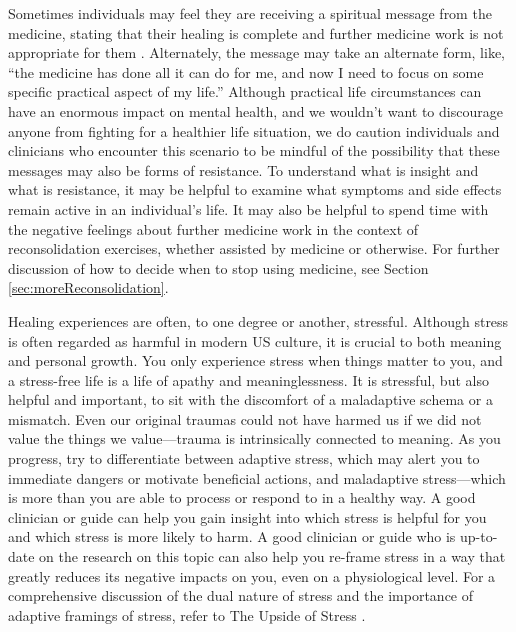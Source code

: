 \documentclass[12pt,letterpaper]{book}
\begin{document}
Sometimes individuals may feel they are receiving a spiritual message from the medicine, stating that their healing is complete and further medicine work is not appropriate for them \cite{razviDissociation}. Alternately, the message may take an alternate form, like, “the medicine has done all it can do for me, and now I need to focus on some specific practical aspect of my life.”  Although practical life circumstances can have an enormous impact on mental health, and we wouldn't want to discourage anyone from fighting for a healthier life situation, we do caution individuals and clinicians who encounter this scenario to be mindful of the possibility that these messages may also be forms of resistance. To understand what is insight and what is resistance, it may be helpful to examine what symptoms and side effects remain active in an individual's life. It may also be helpful to spend time with the negative feelings about further medicine work in the context of reconsolidation exercises, whether assisted by medicine or otherwise. For further discussion of how to decide when to stop using medicine, see Section \ref{sec:moreReconsolidation}.

Healing experiences are often, to one degree or another, stressful. Although stress is often regarded as harmful in modern US culture, it is crucial to both meaning and personal growth. You only experience stress when things matter to you, and a stress-free life is a life of apathy and meaninglessness. It is stressful, but also helpful and important, to sit with the discomfort of a maladaptive schema or a mismatch. Even our original traumas could not have harmed us if we did not value the things we value—trauma is intrinsically connected to meaning. As you progress, try to differentiate between adaptive stress, which may alert you to immediate dangers or motivate beneficial actions, and maladaptive stress—which is more than you are able to process or respond to in a healthy way. A good clinician or guide can help you gain insight into which stress is helpful for you and which stress is more likely to harm. A good clinician or guide who is up-to-date on the research on this topic can also help you re-frame stress in a way that greatly reduces its negative impacts on you, even on a physiological level. For a comprehensive discussion of the dual nature of stress and the importance of adaptive framings of stress, refer to The Upside of Stress \cite{mcgonigalStress}.
\end{document}

